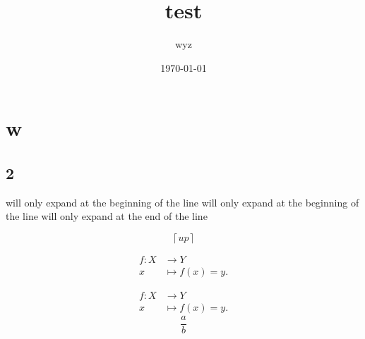 \documentclass{article}
\title{test}
\author{wyz}
\date{\today}
\begin{document}
\maketitle
\section{w}
\subsection{2}

will only expand at the beginning of the line will only expand at the beginning of the line will only expand at the end of the line

\[
  \left\lceil up \right\rceil 
\]

\begin{align*}
  f: X&\longrightarrow Y \\
  x&\longmapsto f(x) = y
.\end{align*}

\begin{equation}
\begin{aligned}
  f: X&\longrightarrow Y \\
  x&\longmapsto f(x) = y
.\end{aligned}
\end{equation}
\[
  \frac{a}{b}
\]
\end{document}
